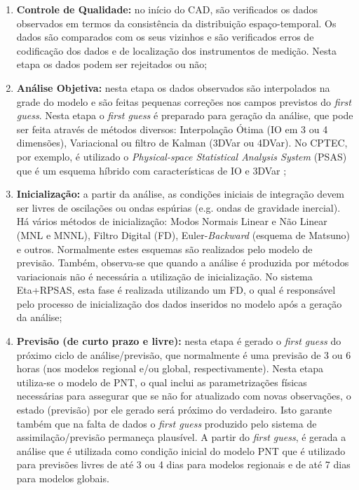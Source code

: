 \begin{enumerate}
\item \textbf{Controle de Qualidade:} no início do CAD, são verificados os dados observados em termos da consistência da distribuição espaço-temporal. Os dados são comparados com os seus vizinhos e são verificados erros de codificação dos dados e de localização dos instrumentos de medição. Nesta etapa os dados podem ser rejeitados ou não;
\item \textbf{Análise Objetiva:} nesta etapa os dados observados são interpolados na grade do modelo e são feitas pequenas correções nos campos previstos do \textit{first guess}. Nesta etapa o \textit{first guess} é preparado para geração da análise, que pode ser feita através de métodos diversos: Interpolação Ótima (IO em 3 ou 4 dimensões), Variacional ou filtro de Kalman (3DVar ou 4DVar). No CPTEC, por exemplo, é utilizado o \textit{Physical-space Statistical Analysis System} (PSAS) que é um esquema híbrido com características de IO e 3DVar \cite{courtieretal98};
\item \textbf{Inicialização:} a partir da análise, as condições iniciais de integração devem ser livres de oscilações ou ondas espúrias (e.g. ondas de gravidade inercial). Há vários métodos de inicialização: Modos Normais Linear e Não Linear (MNL e MNNL), Filtro Digital (FD), Euler-\textit{Backward} (esquema de Matsuno) e outros. Normalmente estes esquemas são realizados pelo modelo de previsão. Também, observa-se que quando a análise é produzida por métodos variacionais não é necessária a utilização de inicialização. No sistema Eta+RPSAS, esta fase é realizada utilizando um FD, o qual é responsável pelo processo de inicialização dos dados inseridos no modelo após a geração da análise;
\item \textbf{Previsão (de curto prazo e livre):} nesta etapa é gerado o \textit{first guess} do próximo ciclo de análise/previsão, que normalmente é uma previsão de 3 ou 6 horas (nos modelos regional e/ou global, respectivamente). Nesta etapa utiliza-se o modelo de PNT, o qual inclui as parametrizações físicas necessárias para assegurar que se não for atualizado com novas observações, o estado (previsão) por ele gerado será próximo do verdadeiro. Isto garante também que na falta de dados o \textit{first guess} produzido pelo sistema de assimilação/previsão permaneça plausível. A partir do \textit{first guess}, é gerada a análise que é utilizada como condição inicial do modelo PNT que é utilizado para previsões livres de até 3 ou 4 dias para modelos regionais e de até 7 dias para modelos globais.
\end{enumerate}